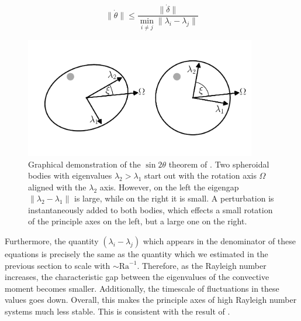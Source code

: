 \documentclass[extra,onecolumn]{gji}
\begin{document}
\begin{equation}
\lVert \dot{\theta} \rVert \le \frac{ \lVert \dot{\delta} \rVert}{ \displaystyle \min_{i \neq j} \lVert \lambda_i - \lambda_j \rVert }
\label{eq:grow_perturbation}
\end{equation} 

\begin{figure}
\centering
\label{fig:perturb}
\includegraphics[width=0.9\textwidth]{figures/perturb.pdf}
\caption{Graphical demonstration of the $\sin{2 \theta}$ theorem of \citet{davis1970rotation}.  Two spheroidal bodies with eigenvalues $\lambda_2 > \lambda_1$ start out with the rotation axis $\Omega$ aligned with the $\lambda_2$ axis. However, on the left the eigengap $\lVert \lambda_2 - \lambda_1 \rVert$ is large, while on the right it is small.  A perturbation is instantaneously added to both bodies, which effects a small rotation of the principle axes on the left, but a large one on the right.}
\end{figure}


Furthermore, the quantity $(\lambda_i-\lambda_j)$ which appears in the denominator of these equations is precisely the same as the quantity which we estimated in the previous section to scale with $\sim \mathrm{Ra}^{-1}$.
Therefore, as the Rayleigh number increases, the characteristic gap between the eigenvalues of the convective moment becomes smaller.  
Additionally, the timescale of fluctuations in these values goes down. 
Overall, this makes the principle axes of high Rayleigh number systems much less stable.
This is consistent with the result of \citet{richards1997explanation}.
\end{document}
